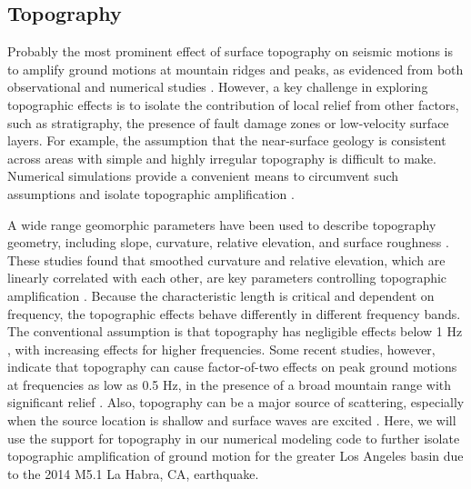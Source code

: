 

\subsection{Topography}
Probably the most prominent effect of surface topography on seismic motions is to amplify ground motions at mountain ridges and peaks, as evidenced from both observational and numerical studies \citep{celebiTopographicalGeologicalAmplifications1987,kawaseTopographyEffectCritical1990,massaExperimentalApproachEstimating2010,burjanekEmpiricalEvidenceLocal2014}. However, a key challenge in exploring topographic effects is to isolate the contribution of local relief from other factors, such as stratigraphy, the presence of fault damage zones or low-velocity surface layers. For example, the assumption that the near-surface geology is consistent across areas with simple and highly irregular topography  \citep{celebiTopographicalGeologicalAmplifications1987,geliEffectTopographyEarthquake1988,chavez-garciaComplexSiteEffects2000} is difficult to make. Numerical simulations provide a convenient means to circumvent such assumptions and isolate topographic ampliﬁcation \citep{booreNoteEffectSimple1972,sanchez-sesmaDiffractionSVRayleigh1991,lovati2011estimation,hartzellGroundMotionPresence2017}.

 A wide range geomorphic parameters have been used to describe topography geometry, including slope, curvature, relative elevation, and surface roughness \citep{ashfordAnalysisTopographicAmplification1997,nguyenEvaluationSeismicGround2007,bouckovalasNumericalEvaluationSlope2005}. These studies found that smoothed curvature and relative elevation, which are linearly correlated with each other, are key parameters controlling topographic amplification \citep{maufroyFrequencyScaledCurvature2015,raiEmpiricalTerrainBasedTopographic2017}. Because the characteristic length is critical and dependent on frequency, the topographic effects behave differently in different frequency bands. The conventional assumption is that topography has negligible effects below 1 Hz \citep{booreNoteEffectSimple1972, pischiuttaTopographicEffectsHill2010}, with increasing effects for higher frequencies. Some recent studies, however, indicate that topography can cause factor-of-two effects on peak ground motions at frequencies as low as 0.5 Hz, in the presence of a broad mountain range with significant relief . Also, topography can be a major source of scattering, especially when the source location is shallow and surface waves are excited \citep{leeEffectsTopographySeismicWave2009, imperatoriRoleTopographyLateral2015}. Here, we will use the support for topography in our numerical modeling code to further isolate topographic amplification of ground motion for the greater Los Angeles basin due to the 2014 M5.1 La Habra, CA, earthquake.


